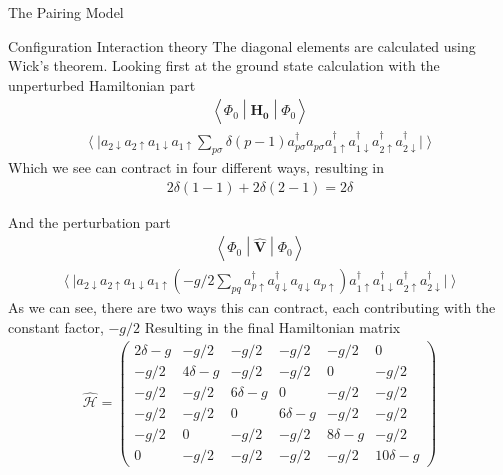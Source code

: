 \documentclass[twoside,english]{uiofysmaster}
\begin{document}
\begin{chapter}{The Pairing Model}
\begin{section}{Configuration Interaction theory}
 The diagonal elements are calculated using Wick's theorem. Looking first at the ground state calculation with the unperturbed Hamiltonian part
 \begin{align}
 	\left< \Phi_0 \middle| \hat{\mathbf{H_0}} \middle| \Phi_0 \right> 
 \end{align}
 \begin{align}
 	\left< \right|  a_{2 \downarrow}  a_{2 \uparrow} a_{1 \downarrow} a_{1 \uparrow} \sum_{p \sigma} \delta (p-1) a_{p \sigma}^{\dagger} a_{p \sigma} 
 	a_{1 \uparrow}^{\dagger} a_{1 \downarrow}^{\dagger} a_{2 \uparrow}^{\dagger} a_{2 \downarrow}^{\dagger} \left| \right> 
 \end{align}
 Which we see can contract in four different ways, resulting in 
 \begin{align}
 	2 \delta (1-1) + 2 \delta (2-1) = 2 \delta
 \end{align}

 And the perturbation part
 \begin{align}
 	\left< \Phi_0 \middle| \hat{\mathbf{V}} \middle| \Phi_0 \right>
 \end{align}
 \begin{align}
 	\left< \right| a_{2 \downarrow}  a_{2 \uparrow} a_{1 \downarrow} a_{1 \uparrow} \left( -g / 2 \sum_{pq} a_{p \uparrow}^{\dagger} a_{q \downarrow}^{\dagger} a_{q \downarrow} a_{p \uparrow} \right) 
 	a_{1 \uparrow}^{\dagger} a_{1 \downarrow}^{\dagger} a_{2 \uparrow}^{\dagger} a_{2 \downarrow}^{\dagger} \left| \right> 
 \end{align}
 As we can see, there are two ways this can contract, each contributing with the constant factor, $-g / 2$
 Resulting in the final Hamiltonian matrix 
 \begin{align}
 	\hat{\mathcal{H}} = \left( \begin{matrix}
 		2 \delta - g & -g / 2 & -g / 2 & -g / 2 & -g / 2 & 0  \\
 		-g / 2 & 4 \delta - g & -g / 2 & -g / 2 & 0 & -g / 2  \\
 		-g / 2 & -g / 2 & 6 \delta - g & 0 & -g / 2 & -g / 2 \\
 		-g / 2 & -g / 2 & 0 & 6 \delta - g & -g / 2 & -g / 2 \\
 		-g / 2 & 0 & -g / 2 & -g / 2 & 8 \delta - g & -g / 2 \\
 		0 & -g / 2 & -g / 2 & -g / 2 & -g / 2 & 10 \delta - g 
 	\end{matrix} \right)
 \end{align}

 \end{section}


\end{chapter}
\end{document}
